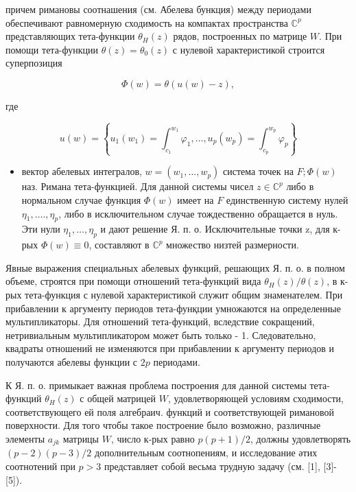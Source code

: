 \documentclass[10pt]{article}
\begin{document}
причем римановы соотнашения (см. Абелева бункция) между периодами обеспечивают равномерную сходимость на компактах пространства $\mathbb{C}^{p}$ представляющих тета-функции $\theta_{H}(z)$ рядов, построенных по матрице $W$. При помощи тета-функции $\theta(z)=\theta_{0}(z)$ с нулевой характеристикой строится суперпозиция



\[

\Phi(w)=\theta(u(w)-z),

\]



где



\[

u(w)=\left\{u_{1}\left(w_{1}\right)=\int_{c_{1}}^{w_{1}} \varphi_{1}, \ldots, u_{p}\left(w_{p}\right)=\int_{c_{p}}^{w_{p}} \varphi_{p}\right\}

\]



\begin{itemize}

  \item вектор абелевых интегралов, $w=\left(w_{1}, \ldots, w_{p}\right)$ система точек на $F ; \Phi(w)$ наз. Римана тета-функцией. Для данной системы чисел $z \in \mathbb{C}^{p}$ либо в нормальном случае функция $\Phi(w)$ имеет на $F$ единственную систему нулей $\eta_{1}, \ldots ., \eta_{p}$, либо в исключительном случае тождественно обращается в нуль. Эти нули $\eta_{1}, \ldots, \eta_{p}$ и дают решение Я. п. о. Исключительные точки z, для к-рых $\Phi(w) \equiv 0$, составляют в $\mathbb{C}^{p}$ множество низтей размерности.

\end{itemize}



Явные выражения специальных абелевых функций, решающих Я. п. о. в полном объеме, строятся при помощи отношений тета-функций вида $\theta_{H}(z) / \theta(z)$, в к-рых тета-функция с нулевой характеристикой служит общим знаменателем. При прибавлении к аргументу периодов тета-фунқции умножаются на определенные мультипликаторы. Для отношений тета-функций, вследствие сокращений, нетривиальным мультипликатором может быть только - 1. Следовательно, квадраты отношений не изменяются при прибавлении к аргументу периодов и получаются абелевы функции с $2 p$ периодами.



К Я. п. о. примыкает важная проблема построения для данной системы тета-функций $\theta_{H}(z)$ с общей матрицей $W$, удовлетворяющей условиям сходимости, соответствующего ей поля алгебраич. функций и соответствующей римановой поверхности. Для того чтобы такое построение было возможно, различные элементы $a_{j k}$ матрицы $W$, число к-рых равно $p(p+1) / 2$, должны удовлетворять $(p-2)(p-3) / 2$ дополнительным соотнопениям, и исследование әтих соотнотений при $p>3$ представляет собой весьма трудную задачу (см. [1], [3]-[5]).
\end{document}
